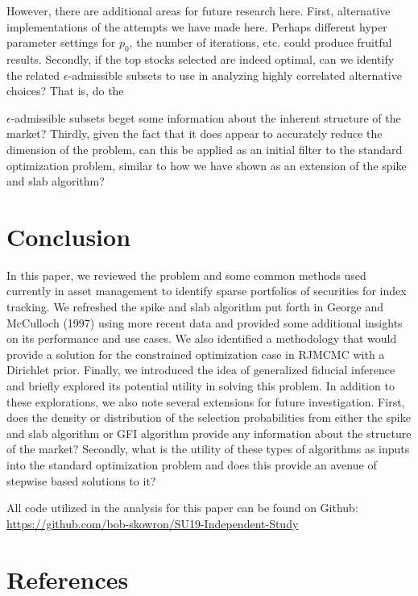 \documentclass[a4paper, 12pt]{article}
\theoremstyle{plain}
\theoremstyle{definition}
\theoremstyle{remark}
\begin{document}
However, there are additional areas for future research here. First, alternative implementations of the attempts we have made here. Perhaps different hyper parameter settings for $p_0$, the number of iterations, etc. could produce fruitful results. Secondly, if the top stocks selected are indeed optimal, can we identify the related $\epsilon$-admissible subsets to use in analyzing highly correlated alternative choices? That is, do the {$\epsilon$-admissible subsets beget some information about the inherent structure of the market? Thirdly, given the fact that it does appear to accurately reduce the dimension of the problem, can this be applied as an initial filter to the standard optimization problem, similar to how we have shown as an extension of the spike and slab algorithm?

\section{Conclusion}

In this paper, we reviewed the problem and some common methods used currently in asset management to identify sparse portfolios of securities for index tracking. We refreshed the spike and slab algorithm put forth in George and McCulloch (1997) using more recent data and provided some additional insights on its performance and use cases. We also identified a methodology that would provide a solution for the constrained optimization case in RJMCMC with a Dirichlet prior. Finally, we introduced the idea of generalized fiducial inference and briefly explored its  potential utility in solving this problem. In addition to these explorations, we also note several extensions for future investigation. First, does the density or distribution of the selection probabilities from either the spike and slab algorithm or GFI algorithm provide any information about the structure of the market? Secondly, what is the utility of these types of algorithms as inputs into the standard optimization problem and does this provide an avenue of stepwise based solutions to it?

All code utilized in the analysis for this paper can be found on Github: \href{https://github.com/bob-skowron/SU19-Independent-Study}{https://github.com/bob-skowron/SU19-Independent-Study}

\section*{References}

}
\end{document}
